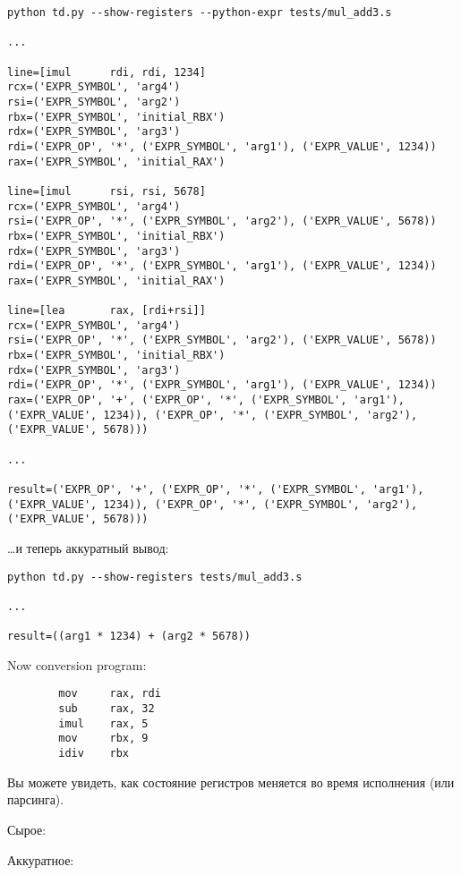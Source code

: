 \begin{lstlisting}
python td.py --show-registers --python-expr tests/mul_add3.s

...

line=[imul      rdi, rdi, 1234]
rcx=('EXPR_SYMBOL', 'arg4')
rsi=('EXPR_SYMBOL', 'arg2')
rbx=('EXPR_SYMBOL', 'initial_RBX')
rdx=('EXPR_SYMBOL', 'arg3')
rdi=('EXPR_OP', '*', ('EXPR_SYMBOL', 'arg1'), ('EXPR_VALUE', 1234))
rax=('EXPR_SYMBOL', 'initial_RAX')

line=[imul      rsi, rsi, 5678]
rcx=('EXPR_SYMBOL', 'arg4')
rsi=('EXPR_OP', '*', ('EXPR_SYMBOL', 'arg2'), ('EXPR_VALUE', 5678))
rbx=('EXPR_SYMBOL', 'initial_RBX')
rdx=('EXPR_SYMBOL', 'arg3')
rdi=('EXPR_OP', '*', ('EXPR_SYMBOL', 'arg1'), ('EXPR_VALUE', 1234))
rax=('EXPR_SYMBOL', 'initial_RAX')

line=[lea       rax, [rdi+rsi]]
rcx=('EXPR_SYMBOL', 'arg4')
rsi=('EXPR_OP', '*', ('EXPR_SYMBOL', 'arg2'), ('EXPR_VALUE', 5678))
rbx=('EXPR_SYMBOL', 'initial_RBX')
rdx=('EXPR_SYMBOL', 'arg3')
rdi=('EXPR_OP', '*', ('EXPR_SYMBOL', 'arg1'), ('EXPR_VALUE', 1234))
rax=('EXPR_OP', '+', ('EXPR_OP', '*', ('EXPR_SYMBOL', 'arg1'), ('EXPR_VALUE', 1234)), ('EXPR_OP', '*', ('EXPR_SYMBOL', 'arg2'), ('EXPR_VALUE', 5678)))

...

result=('EXPR_OP', '+', ('EXPR_OP', '*', ('EXPR_SYMBOL', 'arg1'), ('EXPR_VALUE', 1234)), ('EXPR_OP', '*', ('EXPR_SYMBOL', 'arg2'), ('EXPR_VALUE', 5678)))
\end{lstlisting}

\dots и теперь аккуратный вывод:

\begin{lstlisting}
python td.py --show-registers tests/mul_add3.s

...

result=((arg1 * 1234) + (arg2 * 5678))
\end{lstlisting}

Now conversion program:

\begin{lstlisting}
        mov     rax, rdi
        sub     rax, 32
        imul    rax, 5
        mov     rbx, 9
        idiv    rbx
\end{lstlisting}

Вы можете увидеть, как состояние регистров меняется во время исполнения (или парсинга).

Сырое:



Аккуратное:

